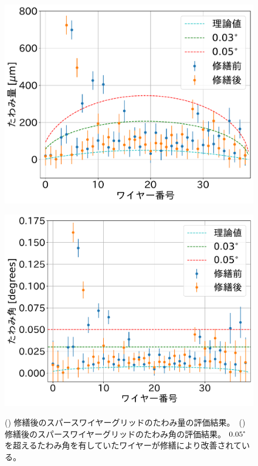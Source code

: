 \documentclass[../../main.tex]{subfiles}
\begin{document}
\begin{figure}[H]
    \begin{minipage}[b]{0.5\hsize}
        \centering
        \includegraphics[width=1.0\textwidth]{wiresag_swg/swg_sag_comparison.pdf}
        \subcaption{}
        \label{fig:wiresag_swg_sag_result_repair}
    \end{minipage}
    \begin{minipage}[b]{0.5\hsize}
        \centering
        \includegraphics[width=1.0\textwidth]{wiresag_swg/swg_sag_angle_comparison.pdf}
        \subcaption{}
        \label{fig:wiresag_swg_sag_angle_result_repair}
    \end{minipage}
    \caption{() 修繕後のスパースワイヤーグリッドのたわみ量の評価結果。\ 
             () 修繕後のスパースワイヤーグリッドのたわみ角の評価結果。
             $0.05\tcdegree$を超えるたわみ角を有していたワイヤーが修繕により改善されている。}
    \label{fig:wiresag_swg_result_repair}
\end{figure}
\end{document}
